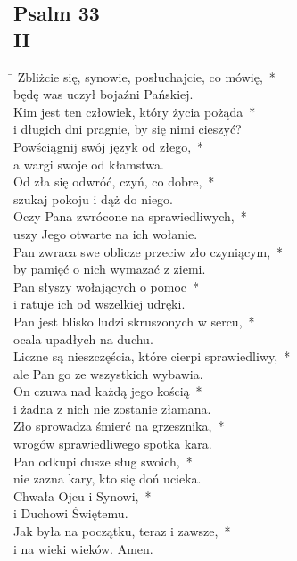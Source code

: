\subsection*{Psalm 33\\II}
\begin{tabbing}
\hspace{4mm} \= \>\kill
Zbliżcie się, synowie, posłuchajcie, co mówię,~*\\
będę was uczył bojaźni Pańskiej.\\
\>Kim jest ten człowiek, który życia pożąda~*\\
\>i długich dni pragnie, by się nimi cieszyć?\\
Powściągnij swój język od złego,~*\\
a wargi swoje od kłamstwa.\\
\>Od zła się odwróć, czyń, co dobre,~*\\
\>szukaj pokoju i dąż do niego.\\
Oczy Pana zwrócone na sprawiedliwych,~*\\
uszy Jego otwarte na ich wołanie.\\
\>Pan zwraca swe oblicze przeciw zło czyniącym,~*\\
\>by pamięć o nich wymazać z ziemi.\\
Pan słyszy wołających o pomoc~*\\
i ratuje ich od wszelkiej udręki.\\
\>Pan jest blisko ludzi skruszonych w sercu,~*\\
\>ocala upadłych na duchu.\\
Liczne są nieszczęścia, które cierpi sprawiedliwy,~*\\
ale Pan go ze wszystkich wybawia.\\
\>On czuwa nad każdą jego kością~*\\
\>i żadna z nich nie zostanie złamana.\\
Zło sprowadza śmierć na grzesznika,~*\\
wrogów sprawiedliwego spotka kara.\\
\>Pan odkupi dusze sług swoich,~*\\
\>nie zazna kary, kto się doń ucieka.\\
Chwała Ojcu i Synowi,~*\\
i Duchowi Świętemu.\\
\>Jak była na początku, teraz i zawsze,~*\\
\>i na wieki wieków. Amen.
\end{tabbing}

